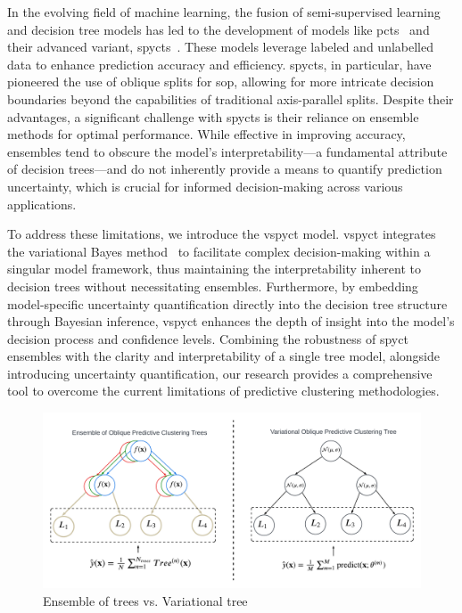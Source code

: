 \documentclass[3p,review,authoryear]{elsarticle}
\begin{document}
In the evolving field of machine learning, the fusion of semi-supervised learning and decision tree models has led to the development of models like \glspl{pct}~\citep{Kocev_2013} and their advanced variant, \glspl{spyct}~\citep{Stepi_nik_2021}.
These models leverage labeled and unlabelled data to enhance prediction accuracy and efficiency.
\Glspl{spyct}, in particular, have pioneered the use of oblique splits for \gls{sop}, allowing for more intricate decision boundaries beyond the capabilities of traditional axis-parallel splits.
Despite their advantages, a significant challenge with \glspl{spyct} is their reliance on ensemble methods for optimal performance.
While effective in improving accuracy, ensembles tend to obscure the model's interpretability—a fundamental attribute of decision trees—and do not inherently provide a means to quantify prediction uncertainty, which is crucial for informed decision-making across various applications.

To address these limitations, we introduce the \gls{vspyct} model.
\gls{vspyct} integrates the variational Bayes method~\citep{Blei_2017} to facilitate complex decision-making within a singular model framework, thus maintaining the interpretability inherent to decision trees without necessitating ensembles.
Furthermore, by embedding model-specific uncertainty quantification directly into the decision tree structure through Bayesian inference, \gls{vspyct} enhances the depth of insight into the model's decision process and confidence levels.
Combining the robustness of \gls{spyct} ensembles with the clarity and interpretability of a single tree model, alongside introducing uncertainty quantification, our research provides a comprehensive tool to overcome the current limitations of predictive clustering methodologies.

\begin{figure}[h!]
    \centering
    \includegraphics[width=1.0\textwidth]{main_flowchart.pdf}
    \caption{Ensemble of trees vs. Variational tree}
    \label{fig:main_flowchart}
\end{figure}
\end{document}
